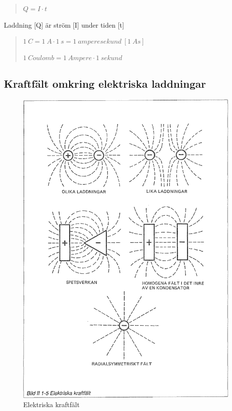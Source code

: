 \begin{quote}
\(Q = I \cdot t\)
\end{quote}

Laddning [Q] är ström [I] under tiden [t]

\begin{quote}
\(1\ C = 1\ A \cdot 1\ s = 1\ amperesekund\ [1\ As]\)

\(1\ Coulomb = 1\ Ampere \cdot 1\ sekund\)
\end{quote}

\subsection{Kraftfält omkring elektriska laddningar}

\begin{figure}
\begin{center}
\includegraphics[width=\textwidth]{images/bild_2_1-05}
\caption{Elektriska kraftfält}
\label{fig:BildII1-5}
\end{center}
\end{figure}

